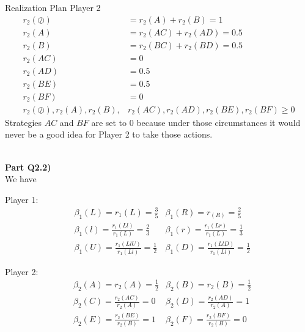 \documentclass[12pt,letter]{article}
\newcommand{\ppart}[1]{\vspace{2mm}\large\textbf{\\Part {#1})\vspace{2mm}}\normalsize\\}
\begin{document}
Realization Plan Player 2
\begin{align*}
    r_2(\oslash) &= r_2(A) + r_2(B) = 1\\
    r_2(A) &= r_2(AC) + r_2(AD) = 0.5\\
    r_2(B) &= r_2(BC) + r_2(BD) = 0.5\\
    r_2(AC) &= 0\\
    r_2(AD) &= 0.5\\
    r_2(BE) &= 0.5\\
    r_2(BF) &= 0\\
    r_2(\oslash),r_2(A),r_2(B),&r_2(AC),r_2(AD),r_2(BE),r_2(BF) \geq 0
\end{align*}
Strategies $AC$ and $BF$ are set to 0 because under those circumstances it would
never be a good idea for Player 2 to take those actions. 

\ppart{Q2.2}
We have

Player 1:
\begin{align*}
    &\beta_1(L) = r_1(L) = \frac35
    &\beta_1(R) = r_(R) = \frac25\\
    &\beta_1(l) = \frac{r_1(Ll)}{r_1(L)} =\frac23
    &\beta_1(r) = \frac{r_1(Lr)}{r_1(L)} =\frac13\\
    &\beta_1(U) = \frac{r_1(LlU)}{r_1(Ll)} = \frac12
    &\beta_1(D) = \frac{r_1(LlD)}{r_1(Ll)} = \frac12
\end{align*}


Player 2:
\begin{align*}
    &\beta_2(A) = r_2(A) = \frac12
    &\beta_2(B) = r_2(B) = \frac12\\
    &\beta_2(C) = \frac{r_2(AC)}{r_2(A)} = 0 
    &\beta_2(D) = \frac{r_2(AD)}{r_2(A)} = 1\\
    &\beta_2(E) = \frac{r_2(BE)}{r_2(B)} = 1
    &\beta_2(F) = \frac{r_2(BF)}{r_2(B)} = 0
\end{align*}
\end{document}
